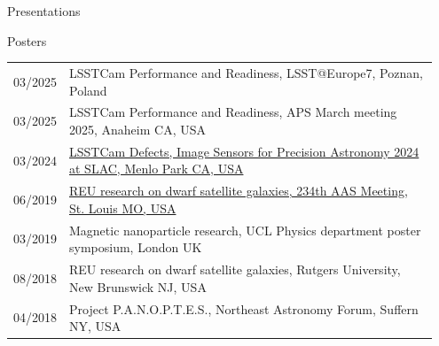 \documentclass{resume} %
\begin{document}
\begin{rSection}{Presentations}
\begin{rSubsection}{Posters}{}{}{}
\begin{table}[h]
\setlength{\extrarowheight}{3pt} 
\begin{tabular}{p{0.07\linewidth} p{0.88\linewidth}}
03/2025 & LSSTCam Performance and Readiness, LSST@Europe7, Poznan, Poland\\
03/2025 & LSSTCam Performance and Readiness, APS March meeting 2025, Anaheim CA, USA\\
03/2024 & \href{https://indico.slac.stanford.edu/event/8442/contributions/8626/}{LSSTCam Defects, Image Sensors for Precision Astronomy 2024 at SLAC, Menlo Park CA, USA}\\
06/2019 & \href{https://assets.pubpub.org/d14kkapv/41575915658488.pdf}{REU research on dwarf satellite galaxies, 234th AAS Meeting, St. Louis MO, USA}\\
03/2019 & Magnetic nanoparticle research, UCL Physics department poster symposium, London UK\\
08/2018 & REU research on dwarf satellite galaxies, Rutgers University, New Brunswick NJ, USA\\
04/2018 & Project P.A.N.O.P.T.E.S., Northeast Astronomy Forum, Suffern NY, USA\\
\end{tabular}
\end{table}
\end{rSubsection}

\end{rSection}
\end{document}
